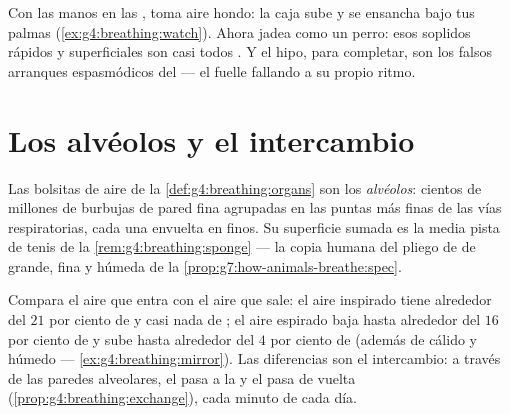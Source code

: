 \begin{example}\label{ex:g7:lungs-and-gas-exchange:feel}
Con las manos en las , toma aire hondo: la caja sube y se
ensancha bajo tus palmas (\cref{ex:g4:breathing:watch}). Ahora jadea
como un perro: esos soplidos rápidos y superficiales son casi todos
. Y el hipo, para completar, son los falsos arranques
espasmódicos del  --- el fuelle fallando a su propio ritmo.
\end{example}

\section{Los alvéolos y el intercambio}

\begin{definition}[Alvéolos]\label{def:g7:lungs-and-gas-exchange:alveoli}
Las bolsitas de aire de la \cref{def:g4:breathing:organs} son los
\emph{alvéolos}: cientos de millones de burbujas de
pared fina agrupadas en las puntas más finas de las vías respiratorias,
cada una envuelta en  finos. Su superficie sumada es la
media pista de tenis de la \cref{rem:g4:breathing:sponge} --- la copia
humana del pliego de  de grande, fina y húmeda de la
\cref{prop:g7:how-animals-breathe:spec}.
\end{definition}

\begin{proposition}\label{prop:g7:lungs-and-gas-exchange:numbers}
Compara el aire que entra con el aire que sale: el aire inspirado tiene
alrededor del $21$ por ciento de  y casi nada de ; el aire espirado baja hasta alrededor del $16$ por ciento de
 y sube hasta alrededor del $4$ por ciento de 
(además de cálido y húmedo --- \cref{ex:g4:breathing:mirror}). Las
diferencias son el intercambio: a través de las paredes alveolares, el
 pasa a la  y el  pasa de vuelta
(\cref{prop:g4:breathing:exchange}), cada minuto de cada día.
\end{proposition}
\admitted

